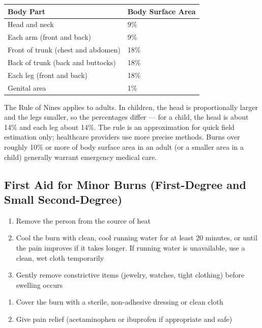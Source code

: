 \begin{center}
\begin{tabular}{@{}ll@{}}
\hline
\textbf{Body Part} & \textbf{Body Surface Area} \\
\hline
Head and neck & 9\% \\
Each arm (front and back) & 9\% \\
Front of trunk (chest and abdomen) & 18\% \\
Back of trunk (back and buttocks) & 18\% \\
Each leg (front and back) & 18\% \\
Genital area & 1\% \\
\hline
\end{tabular}
\end{center}

The Rule of Nines applies to adults. In children, the head is proportionally larger and the legs smaller, so the percentages differ — for a child, the head is about 14\% and each leg about 14\%. The rule is an approximation for quick field estimation only; healthcare providers use more precise methods. Burns over roughly 10\% or more of body surface area in an adult (or a smaller area in a child) generally warrant emergency medical care.

\subsection{First Aid for Minor Burns (First-Degree and Small Second-Degree)}

\begin{enumerate}[leftmargin=*]
\item Remove the person from the source of heat
\item Cool the burn with clean, cool running water for at least 20 minutes, or until the pain improves if it takes longer. If running water is unavailable, use a clean, wet cloth temporarily \cite{aha_arc_2024}
\item Gently remove constrictive items (jewelry, watches, tight clothing) before swelling occurs
\end{enumerate}

\begin{enumerate}[leftmargin=*]
\item Cover the burn with a sterile, non-adhesive dressing or clean cloth
\item Give pain relief (acetaminophen or ibuprofen if appropriate and safe)
\end{enumerate}

